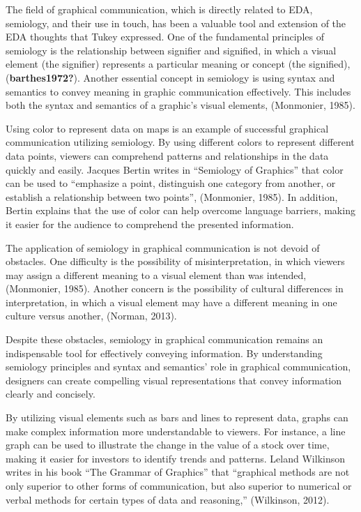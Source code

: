 \documentclass[print]{nuthesis}
\begin{document}
The field of graphical communication, which is directly related to EDA, semiology, and their use in touch, has been a valuable tool and extension of the EDA thoughts that Tukey expressed.
One of the fundamental principles of semiology is the relationship between signifier and signified, in which a visual element (the signifier) represents a particular meaning or concept (the signified), (\textbf{barthes1972?}).
Another essential concept in semiology is using syntax and semantics to convey meaning in graphic communication effectively.
This includes both the syntax and semantics of a graphic's visual elements, (Monmonier, 1985).

Using color to represent data on maps is an example of successful graphical communication utilizing semiology.
By using different colors to represent different data points, viewers can comprehend patterns and relationships in the data quickly and easily.
Jacques Bertin writes in ``Semiology of Graphics'' that color can be used to ``emphasize a point, distinguish one category from another, or establish a relationship between two points'', (Monmonier, 1985).
In addition, Bertin explains that the use of color can help overcome language barriers, making it easier for the audience to comprehend the presented information.

The application of semiology in graphical communication is not devoid of obstacles.
One difficulty is the possibility of misinterpretation, in which viewers may assign a different meaning to a visual element than was intended, (Monmonier, 1985).
Another concern is the possibility of cultural differences in interpretation, in which a visual element may have a different meaning in one culture versus another, (Norman, 2013).

Despite these obstacles, semiology in graphical communication remains an indispensable tool for effectively conveying information.
By understanding semiology principles and syntax and semantics' role in graphical communication, designers can create compelling visual representations that convey information clearly and concisely.

By utilizing visual elements such as bars and lines to represent data, graphs can make complex information more understandable to viewers.
For instance, a line graph can be used to illustrate the change in the value of a stock over time, making it easier for investors to identify trends and patterns. Leland Wilkinson writes in his book ``The Grammar of Graphics'' that ``graphical methods are not only superior to other forms of communication, but also superior to numerical or verbal methods for certain types of data and reasoning,'' (Wilkinson, 2012).
\end{document}
